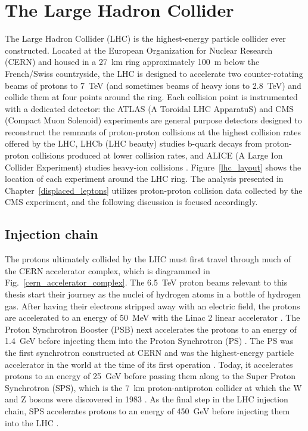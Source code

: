 \section{The Large Hadron Collider}
The Large Hadron Collider (LHC) is the highest-energy particle collider ever constructed. Located at the European Organization for Nuclear Research (CERN) and housed in a \SI{27}{\km} ring approximately \SI{100}{\m} below the French/Swiss countryside, the LHC is designed to accelerate two counter-rotating beams of protons to \SI{7}{\TeV} (and sometimes beams of heavy ions to \SI{2.8}{\TeV}) and collide them at four points around the ring. Each collision point is instrumented with a dedicated detector: the ATLAS (A Toroidal LHC ApparatuS) and CMS (Compact Muon Solenoid) experiments are general purpose detectors designed to reconstruct the remnants of proton-proton collisions at the highest collision rates offered by the LHC, LHCb (LHC beauty) studies b-quark decays from proton-proton collisions produced at lower collision rates, and ALICE (A Large Ion Collider Experiment) studies heavy-ion collisions \cite{lhc_machine}. Figure~\ref{lhc_layout} shows the location of each experiment around the LHC ring. The analysis presented in Chapter~\ref{displaced_leptons} utilizes proton-proton collision data collected by the CMS experiment, and the following discussion is focused accordingly.



\subsection{Injection chain}
The protons ultimately collided by the LHC must first travel through much of the CERN accelerator complex, which is diagrammed in Fig.~\ref{cern_accelerator_complex}. The \SI{6.5}{\TeV} proton beams relevant to this thesis start their journey as the nuclei of hydrogen atoms in a bottle of hydrogen gas. After having their electrons stripped away with an electric field, the protons are accelerated to an energy of \SI{50}{\MeV} with the Linac 2 linear accelerator \cite{linac2}. The Proton Synchrotron Booster (PSB) next accelerates the protons to an energy of \SI{1.4}{\GeV} before injecting them into the Proton Synchrotron (PS) \cite{psb}. The PS was the first synchrotron constructed at CERN and was the highest-energy particle accelerator in the world at the time of its first operation \cite{cern_annual_report_1959}. Today, it accelerates protons to an energy of \SI{25}{\GeV} before passing them along to the Super Proton Synchrotron (SPS), which is the \SI{7}{\km} proton-antiproton collider at which the W and Z bosons were discovered in 1983 \cite{sps}. As the final step in the LHC injection chain, SPS accelerates protons to an energy of \SI{450}{\GeV} before injecting them into the LHC \cite{lhc_machine}.


